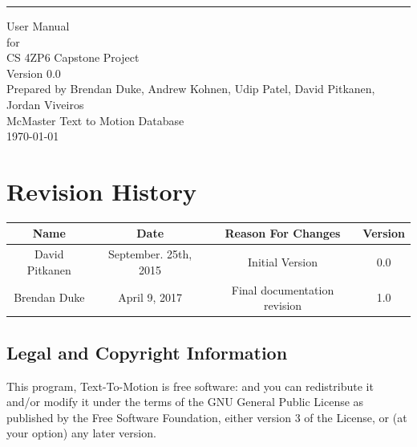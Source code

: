\documentclass{scrreprt}
\date{}
\def\myversion{0.0}
\begin{document}
\begin{flushright}
    \rule{16cm}{5pt}\vskip1cm
    \begin{bfseries}
        \Huge{User Manual }\\
        \vspace{1.4cm}
        for\\
        \vspace{1.4cm}
        CS 4ZP6 Capstone Project\\
        \vspace{1.4cm}
        \LARGE{Version \myversion}\\
        \vspace{1.4cm}
        Prepared by Brendan Duke, Andrew Kohnen, Udip Patel, David Pitkanen, Jordan Viveiros\\
        \vspace{1.4cm}
        McMaster Text to Motion Database\\
        \vspace{1.4cm}
        \today\\
    \end{bfseries}
\end{flushright}

\listoffigures


\tableofcontents

\chapter*{Revision History}

\begin{center}
    \begin{tabular}{|c|c|c|c|}
        \hline
            Name & Date & Reason For Changes & Version\\
        \hline
	    David Pitkanen & September. 25th, 2015 & Initial Version & 0.0\\
	    Brendan Duke & April 9, 2017 & Final documentation revision & 1.0\\
        \hline
    \end{tabular}
\end{center}

\section{Legal and Copyright Information}

This program, Text-To-Motion is free software: and you can redistribute it
and/or modify it under the terms of the GNU General Public License as published
by the Free Software Foundation, either version 3 of the License, or (at your
option) any later version.
\end{document}
